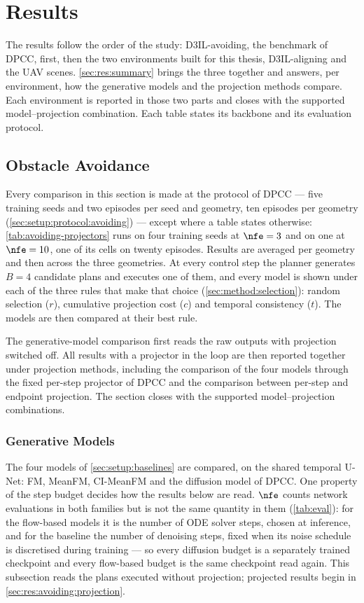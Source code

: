 \chapter{Results}\label{ch:results}

The results follow the order of the study: D3IL-avoiding, the benchmark of \ac{DPCC}, first, then
the two environments built for this thesis, D3IL-aligning and the UAV scenes. \autoref{sec:res:summary} brings the three together and
answers, per environment, how the generative models and the projection methods compare. Each
environment is reported in those two parts and closes with the supported model--projection combination.
Each table states its backbone and its evaluation protocol.

\section{Obstacle Avoidance}\label{sec:res:state}

Every comparison in this section is made at the protocol of \ac{DPCC} --- five training seeds and two
episodes per seed and geometry, ten episodes per geometry (\autoref{sec:setup:protocol:avoiding}) ---
except where a table states otherwise: \autoref{tab:avoiding-projectors} runs on four training seeds at
$\nfe=3$ and on one at $\nfe=10$, one of its cells on twenty episodes.
Results are averaged per geometry and then across the three geometries. At every control step the planner generates
$B=4$ candidate plans and executes one of them, and every model is shown under each of the three rules
that make that choice (\autoref{sec:method:selection}): random selection ($r$), cumulative projection
cost ($c$) and temporal consistency ($t$). The models are then compared at their best rule.

The generative-model comparison first reads the raw outputs with projection switched off. All results
with a projector in the loop are then reported together under projection methods, including the
comparison of the four models through the fixed per-step projector of \ac{DPCC} and the comparison
between per-step and endpoint projection. The section closes with the supported model--projection
combinations.

\subsection{Generative Models}\label{sec:res:avoiding:models}

The four models of \autoref{sec:setup:baselines} are compared, on the shared temporal U-Net: FM,
MeanFM, CI-MeanFM and the diffusion model of \ac{DPCC}. One property of the step budget decides how the
results below are read. $\nfe$ counts network evaluations in both families but is not the same quantity
in them (\autoref{tab:eval}): for the flow-based models it is the number of ODE solver steps, chosen at
inference, and for the baseline the number of denoising steps, fixed when its noise schedule is
discretised during training --- so every diffusion budget is a separately trained checkpoint and every
flow-based budget is the same checkpoint read again. This subsection reads the plans executed without
projection; projected results begin in \autoref{sec:res:avoiding:projection}.

